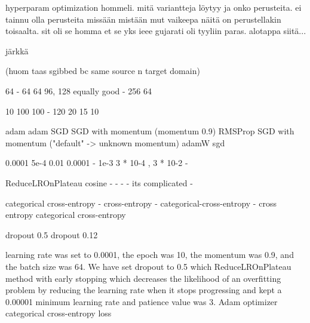 hyperparam optimization hommeli. mitä variantteja löytyy ja onko perusteita.
ei tainnu olla perusteita missään mistään mut vaikeepa näitä on perustellakin toisaalta.
sit oli se homma et se yks ieee gujarati oli tyyliin paras. alotappa siitä...


järkkä
\cite{8goelGujarati2023}
\cite{9thuonPalm}
\cite{7rizkybasicCnnTransfer}
\cite{10goelGujarati}
\cite{6shoponBangla}
\cite{5rasheedHandwrittenUrduWAlexNet}
\cite{3chatterjeeBengali}
\cite{2limbachiyaGujarati}
\cite{1akhlaghiFarsi}

(huom taas \cite{4zhaoTibetan} sgibbed bc same source n target domain)

64 \cite{8goelGujarati2023}
- \cite{9thuonPalm}
64
64
96, 128 equally good
-
256
64

10 \cite{8goelGujarati2023}
100 \cite{9thuonPalm}
100
-
120
20
15
10

adam \cite{8goelGujarati2023}
adam \cite{9thuonPalm}
SGD
SGD with momentum (momentum 0.9)
RMSProp
SGD with momentum ("default" -> unknown momentum)
adamW
sgd

0.0001 \cite{8goelGujarati2023}
5e-4 \cite{9thuonPalm}
0.01
0.0001
-
1e-3
3 * 10-4 , 3 * 10-2
-

ReduceLROnPlateau \cite{8goelGujarati2023} 
cosine \cite{9thuonPalm}
-
-
-
-
its complicated
-

categorical cross-entropy \cite{8goelGujarati2023}
- \cite{9thuonPalm}
cross-entropy
-
categorical-cross-entropy
-
cross entropy
categorical cross-entropy


dropout 0.5 \cite{8goelGujarati2023}
dropout 0.12 \cite{2limbachiyaGujarati}

\cite{8goelGujarati2023}
learning rate was set to 0.0001, 
the
epoch was 10,
 the momentum was 0.9, and the 
 batch size
was 64. 
We have set dropout to 0.5 which
ReduceLROnPlateau method with early stopping
which decreases the likelihood of an overfitting problem by
reducing the learning rate when it stops progressing and
kept a 0.00001 minimum learning rate and patience value
was 3. 
Adam optimizer
categorical cross-entropy loss